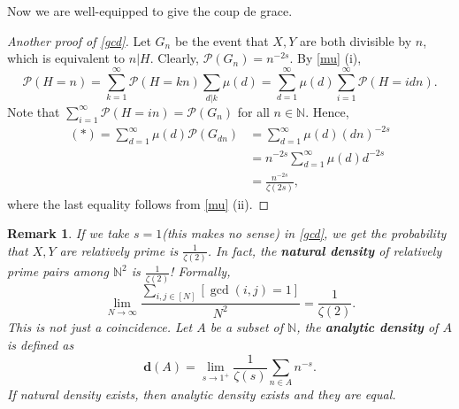 \documentclass[12pt]{article}
\newtheorem*{remark}{Remark}
\newcommand\N{\mathbb{N}}
\newcommand\pp{\mathcal{P}}
\begin{document}
Now we are well-equipped to give the coup de grace. 
\begin{proof}[Another proof of \cref{gcd}]
    Let $G_n$ be the event that $X,Y$ are both divisible by $n$,
    which is equivalent to $n | H$.
    Clearly, $\pp(G_n) = n^{-2s}$.
    By \cref{mu} (i), 
    \begin{equation}
        \tag{*}
        \pp(H = n) = \sum_{k = 1}^\infty \pp(H = kn) \sum_{d | k} \mu(d) 
        = \sum_{d = 1}^{\infty} \mu(d) \sum_{i = 1}^{\infty} \pp(H = idn).    
    \end{equation}
    Note that $\sum_{i = 1}^{\infty} \pp(H = in) = \pp(G_n)$ for all $n \in \N$.
    Hence, 
    \begin{align*}
        (*) = \sum_{d = 1}^{\infty} \mu(d) \pp(G_{dn}) 
        &= \sum_{d = 1}^{\infty} \mu(d) (dn)^{-2s} \\
        &= n^{-2s} \sum_{d = 1}^{\infty}  \mu(d) d^{-2s} \\
        &= \frac{n^{-2s}}{\zeta(2s)},
    \end{align*}
    where the last equality follows from \cref{mu} (ii).
\end{proof}

\begin{remark}
    If we take $s = 1$(this makes no sense) in \cref{gcd}, we get 
    the probability that $X,Y$ are relatively prime is $\frac{1}{\zeta(2)}$.
    In fact, the \textbf{natural density} of relatively prime pairs 
    among $\N^2$ is $\frac{1}{\zeta(2)}$! Formally, 
    $$
        \lim_{N \to \infty} \frac{\sum_{i,j \in [N]}[\gcd(i,j) = 1]}{N^2} = \frac{1}{\zeta(2)}.
    $$    
    This is not just a coincidence. Let $A$ be a subset of $\N$, the \textbf{analytic density} of $A$
    is defined as 
    $$
        \bm{d}(A) = \lim_{s \to 1^{+}} \frac{1}{\zeta(s)} \sum_{n \in A} n^{-s}.
    $$
    If natural density exists, then analytic density exists and they are equal.
\end{remark}
\end{document}
